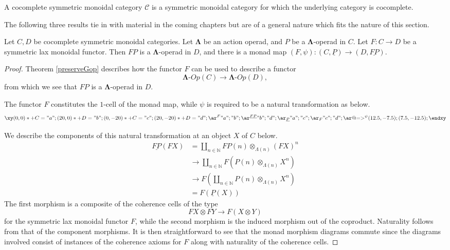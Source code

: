 \documentclass{amsbook} %
\newcommand{\mb}{\mathbf}
\newcommand{\m}[1]{\mathcal{#1}}
\newcommand{\ML}{\mathbf{\Lambda}}
\numberwithin{section}{chapter}
\begin{document}
\begin{Defi}\label{cocom_symm_mon_cat}
A cocomplete symmetric monoidal category $\m{C}$ is a symmetric monoidal category for which the underlying category is cocomplete.
\end{Defi}
The following three results tie in with material in the coming chapters but are of a general nature which fits the nature of this section.


\begin{prop}\label{monoidal_to_monadmap}
Let $C,D$ be cocomplete symmetric monoidal categories.  Let $\ML$ be an action operad, and $P$ be a $\ML$-operad in $C$. Let $F \colon C \rightarrow D$ be a symmetric lax monoidal functor. Then $FP$ is a $\ML$-operad in $D$, and there is a monad map $(F,\psi) \colon (C,\underline{P}) \rightarrow (D, \underline{FP})$.
\end{prop}
\begin{proof}
Theorem \ref{preserveGop} describes how the functor $F$ can be used to describe a functor
  \[
    \mb{\Lambda}\mbox{-}Op(C) \rightarrow \mb{\Lambda}\mbox{-}Op(D),
  \]
from which we see that $FP$ is a $\ML$-operad in $D$.

The functor $F$ constitutes the $1$-cell of the monad map, while $\psi$ is required to be a natural transformation as below.
  \[
    \xy
      (0,0)*+{C}="a";
      (20,0)*+{D}="b";
      (0,-20)*+{C}="c";
      (20,-20)*+{D}="d";
      {\ar^{F} "a" ; "b"};
      {\ar^{\underline{FP}} "b" ; "d"};
      {\ar_{\underline{P}} "a" ; "c"};
      {\ar_{F} "c" ; "d"};
      {\ar@{=>}^{\psi} (12.5, -7.5) ; (7.5,-12.5)};
    \endxy
  \]

We describe the components of this natural transformation at an object $X$ of $C$ below.
  \begin{align*}
    \underline{FP}(FX) &= \coprod_{n \in \mathbb{N}} FP(n) \otimes_{\Lambda(n)} (FX)^n \\
    &\rightarrow \coprod_{n \in \mathbb{N}} F\left(P(n) \otimes_{\Lambda(n)} X^n\right)\\
    &\rightarrow F\left(\coprod_{n \in \mathbb{N}} P(n) \otimes_{\Lambda(n)} X^n\right)\\
    &=F(\underline{P}(X))
  \end{align*}
The first morphism is a composite of the coherence cells of the type
  \[
    FX \otimes FY \rightarrow F(X \otimes Y)
  \]
for the symmetric lax monoidal functor $F$, while the second morphism is the induced morphism out of the coproduct. Naturality follows from that of the component morphisms. It is then straightforward to see that the monad morphism diagrams commute since the diagrams involved consist of instances of the coherence axioms for $F$ along with naturality of the coherence cells.
\end{proof}
\end{document}
